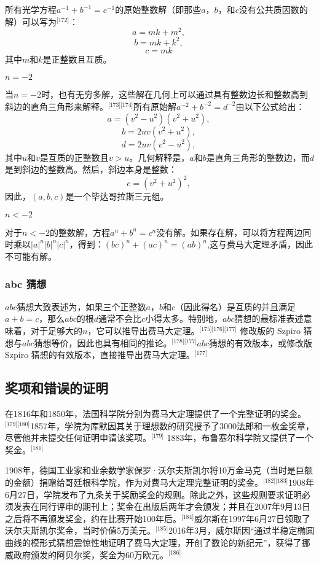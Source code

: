 所有光学方程\( a^{-1} + b^{-1} = c^{-1} \)的原始整数解（即那些\( a \)，\( b \)，和\( c \)没有公共质因数的解）可以写为\(^\text{[172]}\)：
\[
a = mk + m^2,~
\]
\[
b = mk + k^2,~
\]
\[
c = mk~
\]
其中\( m \)和\( k \)是正整数且互质。

\textbf{\( n = -2 \)}

当\( n = -2 \)时，也有无穷多解，这些解在几何上可以通过具有整数边长和整数高到斜边的直角三角形来解释。\(^\text{[173][174]}\)所有原始解\( a^{-2} + b^{-2} = d^{-2} \)由以下公式给出：
\[
a = (v^2 - u^2)(v^2 + u^2),~
\]
\[
b = 2uv(v^2 + u^2),~
\]
\[
d = 2uv(v^2 - u^2),~
\]
其中\( u \)和\( v \)是互质的正整数且\( v > u \)。几何解释是，\( a \)和\( b \)是直角三角形的整数边，而\( d \)是到斜边的整数高。然后，斜边本身是整数：
\[
c = (v^2 + u^2)^2,~
\]
因此，\( (a, b, c) \)是一个毕达哥拉斯三元组。

\textbf{\( n < -2 \)}

对于\( n < -2 \)的整数解，方程\( a^n + b^n = c^n \)没有解。如果存在解，可以将方程两边同时乘以\( |a|^n |b|^n |c|^n \)，得到：\((bc)^n + (ac)^n = (ab)^n\),这与费马大定理矛盾，因此不可能有解。
\subsubsection{abc 猜想}
\(abc\)猜想大致表述为，如果三个正整数\( a \)，\( b \)和\( c \)（因此得名）是互质的并且满足 \( a + b = c \)，那么\( abc \)的根\( d \)通常不会比\( c \)小得太多。特别地，\(abc\)猜想的最标准表述意味着，对于足够大的\( n \)，它可以推导出费马大定理。\(^\text{[175][176][177]}\) 修改版的 Szpiro 猜想与\(abc\)猜想等价，因此也具有相同的推论。\(^\text{[178][177]}\)\(abc\)猜想的有效版本，或修改版 Szpiro 猜想的有效版本，直接推导出费马大定理。\(^\text{[177]}\)
\subsection{奖项和错误的证明}
在1816年和1850年，法国科学院分别为费马大定理提供了一个完整证明的奖金。\(^\text{[179][180]}\)1857年，学院为库默因其关于理想数的研究授予了3000法郎和一枚金奖章，尽管他并未提交任何证明申请该奖项。\(^\text{[179]}\) 1883年，布鲁塞尔科学院又提供了一个奖金。\(^\text{[181]}\)

1908年，德国工业家和业余数学家保罗·沃尔夫斯凯尔将10万金马克（当时是巨额的金额）捐赠给哥廷根科学院，作为对费马大定理完整证明的奖金。\(^\text{[182][183]}\)1908年6月27日，学院发布了九条关于奖励奖金的规则。除此之外，这些规则要求证明必须发表在同行评审的期刊上；奖金在出版后两年才会颁发；并且在2007年9月13日之后将不再颁发奖金，约在比赛开始100年后。\(^\text{[184]}\)威尔斯在1997年6月27日领取了沃尔夫斯凯尔奖金，当时价值5万美元。\(^\text{[185]}\)2016年3月，威尔斯因“通过半稳定椭圆曲线的模形式猜想震惊性地证明了费马大定理，开创了数论的新纪元”，获得了挪威政府颁发的阿贝尔奖，奖金为60万欧元。\(^\text{[186]}\)


